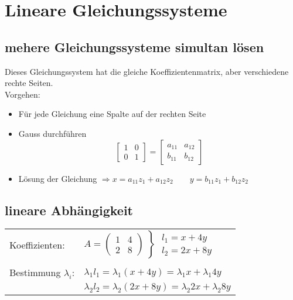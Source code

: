 \section{Lineare Gleichungssysteme}


\subsection{mehere Gleichungssysteme simultan lösen}
	Dieses Gleichungssystem hat die gleiche Koeffizientenmatrix, aber verschiedene rechte  Seiten.\\
	Vorgehen:
	\begin{itemize}
		\item Für jede Gleichung eine Spalte auf der rechten Seite
		\item Gauss durchführen
			\begin{equation*}
				\begin{bmatrix} 1 & 0 \\ 0 & 1 \end{bmatrix} =  \begin{bmatrix} a_{11} & a_{12} \\ b_{11} & b_{12} \end{bmatrix}	
			\end{equation*}
		\item Lösung der Gleichung $\Rightarrow x= a_{11}z_1 + a_{12}z_2 \qquad y= b_{11}z_1 + b_{12}z_2$
	\end{itemize}

\subsection{lineare Abhängigkeit}
	\begin{tabular}{ll}
		Koeffizienten: & $A = \left(\begin{array}{cc} 1 & 4\\ 2 & 8 \end{array}\right) \left\rbrace\begin{array}{l} l_1 = x +4y \\ l_2 = 2x + 8y \end{array}\right.$\\ \\
		Bestimmung $\lambda_i$:  &  $\lambda_1 l_1 = \lambda_1 (x + 4y) = \lambda_1 x + \lambda_1 4y$ \\
		& $\lambda_2 l_2 = \lambda_2 (2x + 8y) = \lambda_2 2x + \lambda_2 8y$
	\end{tabular} \\ \\
	
